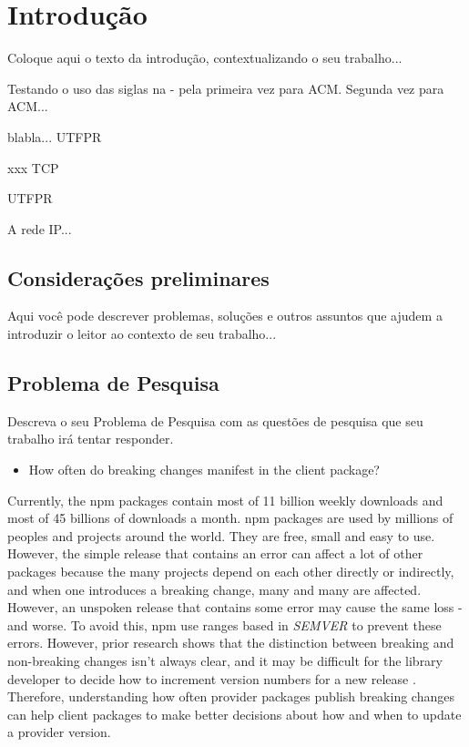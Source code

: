 \chapter{Introdução}
\label{cap:introducao}

Coloque aqui o texto da introdução, contextualizando o seu trabalho...

Testando o uso das siglas na - pela primeira vez para \gls{ACM}. Segunda vez para \gls{ACM}...

blabla... \gls{UTFPR}

xxx \gls{TCP}

\acrlong{UTFPR}

A rede \gls{IP}...

\section{Considerações preliminares}

Aqui você pode descrever problemas, soluções e outros assuntos que ajudem a introduzir o leitor ao contexto de seu trabalho...

\section{Problema de Pesquisa}
\label{cap:introducao:sec:problema:pesquisa}

Descreva o seu Problema de Pesquisa com as questões de pesquisa que seu trabalho irá tentar responder.

\begin{itemize}
    \item How often do breaking changes manifest in the client package?
\end{itemize}
Currently, the npm packages contain most of 11 billion weekly downloads and most of 45 billions of downloads a month. npm packages are used by millions of peoples and projects around the world. They are free, small and easy to use. However, the simple release that contains an error can affect a lot of other packages because the many projects depend on each other directly or indirectly, and when one introduces a breaking change, many and many are affected. However, an unspoken release that contains some error may cause the same loss - and worse. To avoid this, npm use ranges based in \textit{SEMVER} to prevent these errors. However, prior research shows that the distinction between breaking and non-breaking changes isn’t always clear, and it may be difficult for the library developer to decide how to increment version numbers for a new release \cite{noregrets2018}. Therefore, understanding how often provider packages publish breaking changes can help client packages to make better decisions about how and when to update a provider version.

